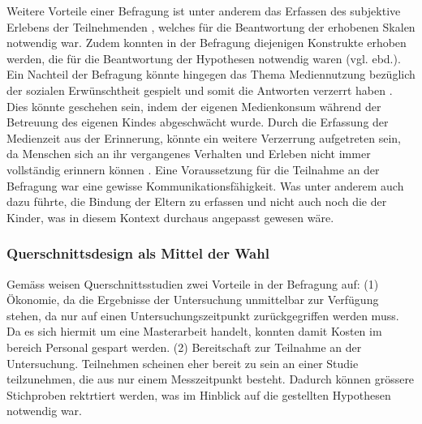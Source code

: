 Weitere Vorteile einer Befragung ist unter anderem das Erfassen des subjektive Erlebens der Teilnehmenden \cite{Berk2005}, welches für die Beantwortung der erhobenen Skalen notwendig war. Zudem konnten in der Befragung diejenigen Konstrukte erhoben werden, die für die Beantwortung der Hypothesen notwendig waren (vgl. ebd.). Ein Nachteil der Befragung könnte hingegen das Thema Mediennutzung bezüglich der sozialen Erwünschtheit gespielt  und somit die Antworten verzerrt haben \cite{Rey2012}. Dies könnte geschehen sein, indem der eigenen Medienkonsum während der Betreuung des eigenen Kindes abgeschwächt wurde. Durch die Erfassung der Medienzeit aus der Erinnerung, könnte ein weitere Verzerrung aufgetreten sein, da Menschen sich an ihr vergangenes Verhalten und Erleben nicht immer vollständig erinnern können \cite{Berk2005}. Eine Voraussetzung für die Teilnahme an der Befragung war eine gewisse Kommunikationsfähigkeit. Was unter anderem auch dazu führte, die Bindung der Eltern zu erfassen und nicht auch noch die der Kinder, was in diesem Kontext durchaus angepasst gewesen wäre.

\subsubsection{Querschnittsdesign als Mittel der Wahl}
Gemäss  weisen Querschnittsstudien zwei Vorteile in der Befragung auf: (1) Ökonomie, da die Ergebnisse der Untersuchung unmittelbar zur Verfügung stehen, da nur auf einen Untersuchungszeitpunkt zurückgegriffen werden muss. Da es sich hiermit um eine Masterarbeit handelt, konnten damit Kosten im bereich Personal gespart werden. (2) Bereitschaft zur Teilnahme an der Untersuchung. Teilnehmen scheinen eher bereit zu sein an einer Studie teilzunehmen, die aus nur einem Messzeitpunkt besteht. Dadurch können grössere Stichproben rektrtiert werden, was im Hinblick auf die gestellten Hypothesen notwendig war. 

